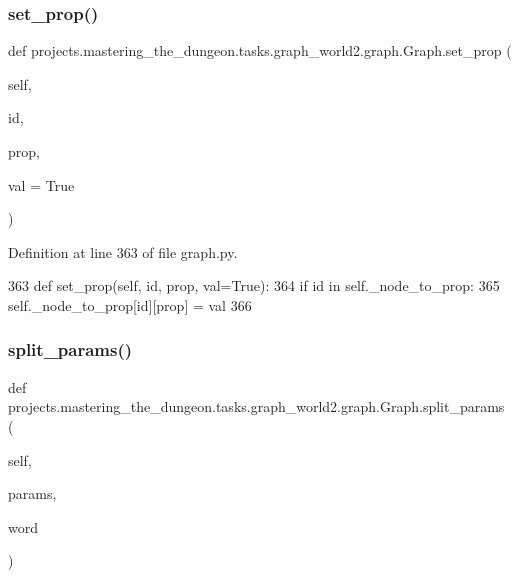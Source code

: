 \subsubsection{\texorpdfstring{set\+\_\+prop()}{set\_prop()}}
{\footnotesize\ttfamily def projects.\+mastering\+\_\+the\+\_\+dungeon.\+tasks.\+graph\+\_\+world2.\+graph.\+Graph.\+set\+\_\+prop (\begin{DoxyParamCaption}\item[{}]{self,  }\item[{}]{id,  }\item[{}]{prop,  }\item[{}]{val = {\ttfamily True} }\end{DoxyParamCaption})}



Definition at line 363 of file graph.\+py.


\begin{DoxyCode}
363     \textcolor{keyword}{def }set\_prop(self, id, prop, val=True):
364         \textcolor{keywordflow}{if} id \textcolor{keywordflow}{in} self.\_node\_to\_prop:
365             self.\_node\_to\_prop[id][prop] = val
366 
\end{DoxyCode}
\mbox{\label{classprojects_1_1mastering__the__dungeon_1_1tasks_1_1graph__world2_1_1graph_1_1Graph_a07dc981149e210b044bdb2faa8d437a9}} 
\subsubsection{\texorpdfstring{split\+\_\+params()}{split\_params()}}
{\footnotesize\ttfamily def projects.\+mastering\+\_\+the\+\_\+dungeon.\+tasks.\+graph\+\_\+world2.\+graph.\+Graph.\+split\+\_\+params (\begin{DoxyParamCaption}\item[{}]{self,  }\item[{}]{params,  }\item[{}]{word }\end{DoxyParamCaption})}




